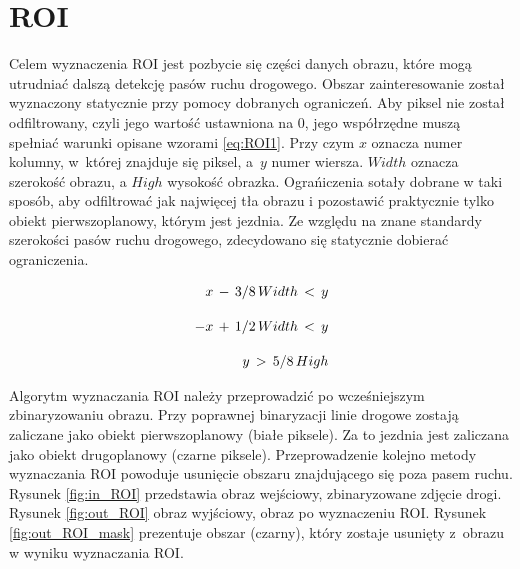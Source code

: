 \section{ROI}
Celem wyznaczenia ROI jest pozbycie się części danych obrazu, które mogą utrudniać dalszą detekcję pasów ruchu drogowego.
Obszar zainteresowanie został wyznaczony statycznie przy pomocy dobranych ograniczeń.
Aby piksel nie został odfiltrowany, czyli jego wartość ustawniona na 0, jego współrzędne muszą spełniać warunki opisane wzorami \eqref{eq:ROI1}. Przy czym $x$ oznacza numer kolumny, w~której znajduje się piksel, a~$y$ numer wiersza. $Width$ oznacza szerokość obrazu, a $High$ wysokość obrazka.
Ograńiczenia sotały dobrane w taki sposób, aby odfiltrować jak najwięcej tła obrazu i pozostawić praktycznie tylko obiekt pierwszoplanowy, którym jest jezdnia.
Ze względu na znane standardy szerokości pasów ruchu drogowego, zdecydowano się statycznie dobierać ograniczenia.

\begin{equation}
{\displaystyle {\begin{aligned}\,x\,-\,3/8 \,Width\,<\,y\\[10pt]\,-x\,+\,1/2 \,Width\,<\,y\\[10pt]\,y\,>\,5/8 \,High\end{aligned}}}\\[10pt]
\label{eq:ROI1}
\end{equation}


Algorytm wyznaczania ROI należy przeprowadzić po wcześniejszym zbinaryzowaniu obrazu. 
Przy poprawnej binaryzacji linie drogowe zostają zaliczane jako obiekt pierwszoplanowy (białe piksele).
Za to jezdnia jest zaliczana jako obiekt drugoplanowy (czarne piksele).
Przeprowadzenie kolejno metody wyznaczania ROI powoduje usunięcie obszaru znajdującego się poza pasem ruchu.
Rysunek \ref{fig:in_ROI} przedstawia obraz wejściowy, zbinaryzowane zdjęcie drogi. Rysunek \ref{fig:out_ROI} obraz wyjściowy, obraz po wyznaczeniu ROI.
Rysunek \ref{fig:out_ROI_mask} prezentuje obszar (czarny), który zostaje usunięty z~obrazu w wyniku wyznaczania ROI.


